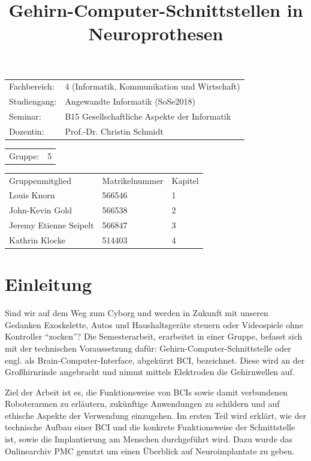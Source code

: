 \documentclass[11pt,ngerman,parskip=half]{scrartcl}
\author{}
\title{Gehirn-Computer-Schnittstellen in Neuroprothesen}
\begin{document}
\clearpage\maketitle
\thispagestyle{empty}
\begin{tabular}{ll}
  Fachbereich: & 4 (Informatik, Kommunikation und Wirtschaft) \\
  Studiengang: & Angewandte Informatik (SoSe2018)             \\
  Seminar:     & B15 Gesellschaftliche Aspekte der Informatik \\
  Dozentin:    & Prof.-Dr. Christin Schmidt                   \\
\end{tabular}

\begin{tabular}{ll}
  Gruppe: & 5 \\
\end{tabular}

\begin{tabular}{lll}
  Gruppenmitglied        & Matrikelnummer & Kapitel\\
  Louis Knorn            & 566546         & 1\\
  John-Kevin Gold        & 566538         & 2\\
  Jeremy Etienne Seipelt & 566847         & 3\\
  Kathrin Klocke         & 514403         & 4\\
\end{tabular}

\pagebreak
\renewcommand{\baselinestretch}{0.75}\normalsize
\tableofcontents
\renewcommand{\baselinestretch}{1.0}\normalsize
\pagebreak
\listoffigures
\pagebreak

\setcounter{page}{1}
\section{Einleitung}
Sind wir auf dem Weg zum Cyborg und werden in Zukunft mit unseren Gedanken
Exoskelette, Autos und Haushaltsgeräte steuern oder Videospiele ohne
Kontroller \enquote{zocken}? Die Se­mes­ter­ar­beit, erarbeitet in einer Gruppe,
befasst sich mit der technischen Voraussetzung dafür:
Gehirn-Computer-Schnittstelle oder engl. als Brain-Computer-Interface,
abgekürzt BCI, bezeichnet. Diese wird an der Großhirnrinde angebracht und
nimmt mittels Elektroden die Gehirnwellen auf.

Ziel der Arbeit ist es, die
Funktionsweise von BCIs sowie damit verbundenen Roboterarmen zu erläutern,
zukünftige Anwendungen zu schildern und auf ethische Aspekte der Verwendung
einzugehen. Im ersten Teil wird erklärt, wie der technische Aufbau einer BCI
und die konkrete Funktionsweise der Schnittstelle ist, sowie die
Implantierung am Menschen durchgeführt wird. Dazu wurde das Onlinearchiv PMC
genutzt um einen Überblick auf Neuroimplantate zu geben.
\end{document}
